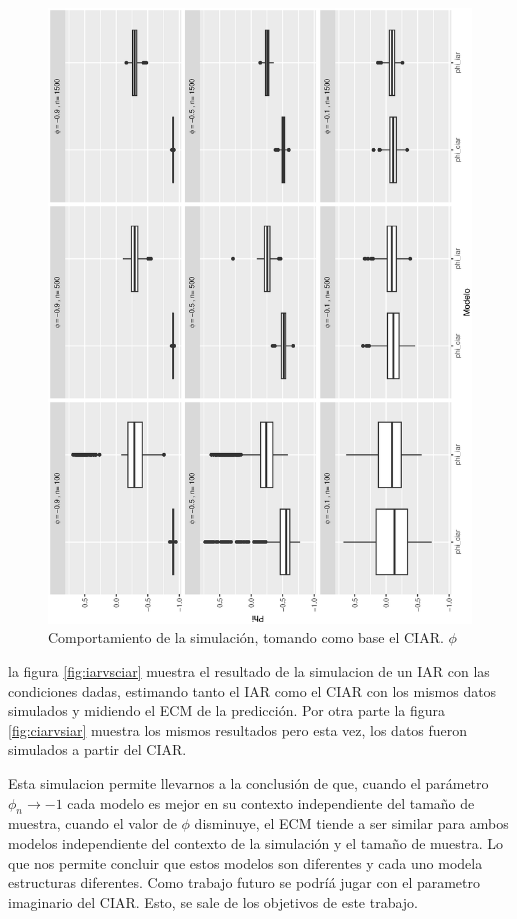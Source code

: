 \begin{figure}[h]
\begin{minipage}{0.45\textwidth}
    \includegraphics[width=0.75\linewidth,angle = 270]{Kap3/Fig_Cap3/sim4_CIARvsIARphi.eps}
    \caption{Comportamiento de la simulación, tomando como base el CIAR. $\phi$}
    \label{fig:ciarvsiarphi}
    \end{minipage}
\end{figure}

la figura \ref{fig:iarvsciar} muestra el resultado de la simulacion de un IAR con las condiciones dadas, estimando tanto  el IAR como el CIAR
con los mismos datos simulados y midiendo el ECM de la predicción. Por otra parte la figura \ref{fig:ciarvsiar} muestra los mismos resultados pero esta vez,
los datos fueron simulados a partir del CIAR.

Esta simulacion permite llevarnos a la conclusión de que, cuando el parámetro $\phi_n \to -1$ cada modelo es mejor en su contexto independiente del tamaño de muestra, cuando el valor de $\phi$ disminuye, el ECM tiende a ser similar para ambos modelos independiente del contexto de la simulación y el tamaño de muestra. Lo que nos permite concluir que estos modelos son diferentes y cada uno modela estructuras diferentes. Como trabajo futuro se podríá jugar con el parametro imaginario del CIAR. Esto, se sale de los objetivos de este trabajo.

